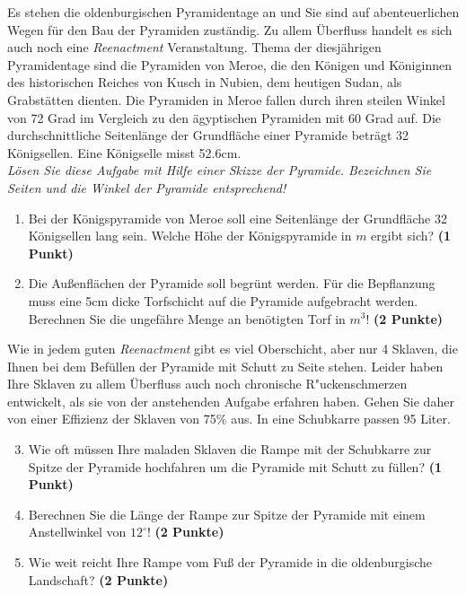 \documentclass[a4paper, 9pt]{scrartcl}\usepackage[]{graphicx}\usepackage[]{xcolor}
\begin{document}
Es stehen die oldenburgischen Pyramidentage an und Sie sind auf
abenteuerlichen Wegen f{\"u}r den Bau der Pyramiden zust{\"a}ndig. Zu allem
{\"U}berfluss handelt es sich auch noch eine \textit{Reenactment}
Veranstaltung. Thema der diesj{\"a}hrigen Pyramidentage sind die Pyramiden von
Meroe, die den K{\"o}nigen und K{\"o}niginnen des historischen Reiches von Kusch in
Nubien, dem heutigen Sudan, als Grabst{\"a}tten dienten. Die Pyramiden in Meroe
fallen durch ihren steilen Winkel von 72 Grad im Vergleich zu
den {\"a}gyptischen Pyramiden mit 60 Grad auf. Die durchschnittliche
Seitenl{\"a}nge der Grundfl{\"a}che einer Pyramide betr{\"a}gt 32 K{\"o}nigsellen. Eine K{\"o}nigselle
misst 52.6cm.\\

\textit{L{\"o}sen Sie diese Aufgabe mit Hilfe einer Skizze der Pyramide. Bezeichnen
  Sie Seiten und die Winkel der Pyramide entsprechend!}

\begin{enumerate}
\item Bei der K{\"o}nigspyramide von Meroe soll eine Seitenl{\"a}nge der Grundfl{\"a}che
  32 K{\"o}nigsellen lang sein. Welche H{\"o}he der K{\"o}nigspyramide in $m$
  ergibt sich? \textbf{(1 Punkt)}
\item Die Au{\ss}enfl{\"a}chen der Pyramide soll begr{\"u}nt werden. F{\"u}r die
  Bepflanzung muss eine 5cm dicke Torfschicht auf die
  Pyramide aufgebracht werden. Berechnen Sie die ungef{\"a}hre Menge an
  ben{\"o}tigten Torf in $m^3$! \textbf{(2 Punkte)}
\end{enumerate}

Wie in jedem guten \textit{Reenactment} gibt es viel Oberschicht, aber nur
4 Sklaven, die Ihnen bei dem Bef{\"u}llen der Pyramide mit Schutt
zu Seite stehen. Leider haben Ihre Sklaven zu allem {\"U}berfluss auch noch
chronische R{"u}ckenschmerzen entwickelt, als sie von der
anstehenden Aufgabe erfahren haben. Gehen Sie daher von einer Effizienz der
Sklaven von 75\% aus. In eine Schubkarre passen
95 Liter.

\begin{enumerate}
  \setcounter{enumi}{2}
\item Wie oft m{\"u}ssen Ihre maladen Sklaven die Rampe mit der Schubkarre
  zur Spitze der Pyramide hochfahren um die Pyramide mit Schutt zu f{\"u}llen? \textbf{(1 Punkt)}
\item Berechnen Sie die L{\"a}nge der Rampe zur Spitze der Pyramide mit einem
  Anstellwinkel von $12^\circ$! \textbf{(2 Punkte)}
\item Wie weit reicht Ihre Rampe vom Fu{\ss} der Pyramide in die oldenburgische
  Landschaft?  \textbf{(2 Punkte)}
\end{enumerate}
\end{document}
